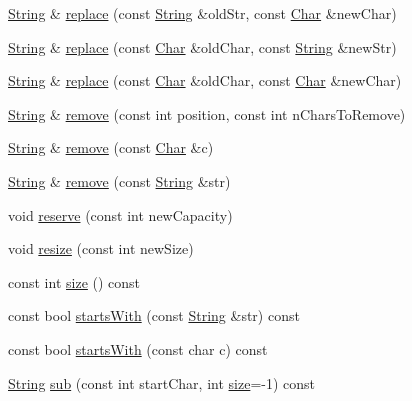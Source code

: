 \begin{DoxyCompactItemize}
\item 
\hyperlink{classprism_1_1_string}{String} \& \hyperlink{classprism_1_1_string_aeaf54043c5a919e901f6aa3a741c5019}{replace} (const \hyperlink{classprism_1_1_string}{String} \&old\+Str, const \hyperlink{classprism_1_1_char}{Char} \&new\+Char)
\item 
\hyperlink{classprism_1_1_string}{String} \& \hyperlink{classprism_1_1_string_a0d37bca0afab3f37d2be64ee4101ca53}{replace} (const \hyperlink{classprism_1_1_char}{Char} \&old\+Char, const \hyperlink{classprism_1_1_string}{String} \&new\+Str)
\item 
\hyperlink{classprism_1_1_string}{String} \& \hyperlink{classprism_1_1_string_a511c58978ebfc1278d36f38bb8fa2d27}{replace} (const \hyperlink{classprism_1_1_char}{Char} \&old\+Char, const \hyperlink{classprism_1_1_char}{Char} \&new\+Char)
\item 
\hyperlink{classprism_1_1_string}{String} \& \hyperlink{classprism_1_1_string_a3ccec53675d61756c3beb1bbc43c981f}{remove} (const int position, const int n\+Chars\+To\+Remove)
\item 
\hyperlink{classprism_1_1_string}{String} \& \hyperlink{classprism_1_1_string_a7529b02c672f5effdd31bdaad3e8f0de}{remove} (const \hyperlink{classprism_1_1_char}{Char} \&c)
\item 
\hyperlink{classprism_1_1_string}{String} \& \hyperlink{classprism_1_1_string_a1d13f42ceb8d784e2379be1394bc4ea6}{remove} (const \hyperlink{classprism_1_1_string}{String} \&str)
\item 
void \hyperlink{classprism_1_1_string_aed752cc8c9e59a7b2366b85ab20a656b}{reserve} (const int new\+Capacity)
\item 
void \hyperlink{classprism_1_1_string_a77b3580eba01007afc7089cfd334abd5}{resize} (const int new\+Size)
\item 
const int \hyperlink{classprism_1_1_string_a603b5a90681d43adf7c6c29018e0300c}{size} () const 
\item 
const bool \hyperlink{classprism_1_1_string_ae9ce1b5a274fc4b672944da555552456}{starts\+With} (const \hyperlink{classprism_1_1_string}{String} \&str) const 
\item 
const bool \hyperlink{classprism_1_1_string_a5ce3cf5ba78faa6c9179fb777cc4c6ac}{starts\+With} (const char c) const 
\item 
\hyperlink{classprism_1_1_string}{String} \hyperlink{classprism_1_1_string_a4249170c6ee2d8d409e7b2c1c66092e4}{sub} (const int start\+Char, int \hyperlink{classprism_1_1_string_a603b5a90681d43adf7c6c29018e0300c}{size}=-\/1) const 

\end{DoxyCompactItemize}
